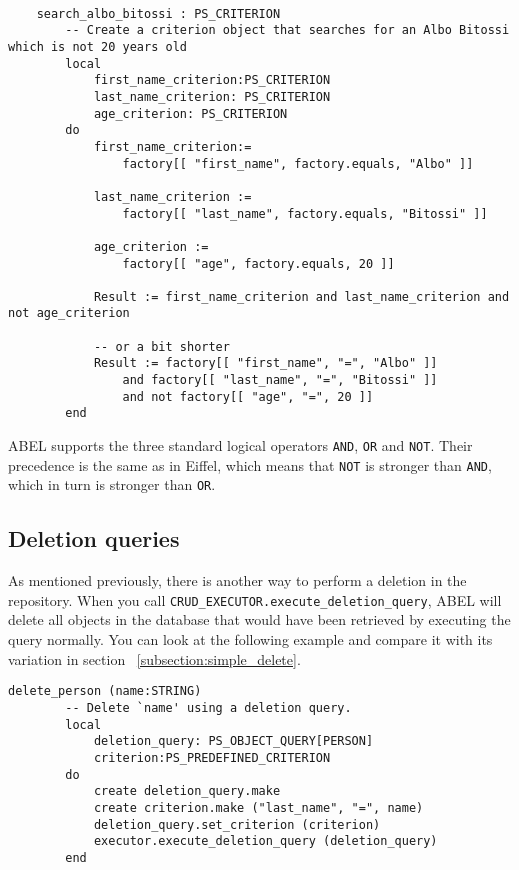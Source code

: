 \begin{lstlisting}[language=OOSC2Eiffel, captionpos=b, caption={}, label={lst:search_albo_bitossi}]

	search_albo_bitossi : PS_CRITERION
		-- Create a criterion object that searches for an Albo Bitossi which is not 20 years old
		local
			first_name_criterion:PS_CRITERION
			last_name_criterion: PS_CRITERION
			age_criterion: PS_CRITERION
		do
			first_name_criterion:= 
				factory[[ "first_name", factory.equals, "Albo" ]]

			last_name_criterion := 
				factory[[ "last_name", factory.equals, "Bitossi" ]]

			age_criterion := 
				factory[[ "age", factory.equals, 20 ]]
			
			Result := first_name_criterion and last_name_criterion and not age_criterion

			-- or a bit shorter
			Result := factory[[ "first_name", "=", "Albo" ]] 
				and factory[[ "last_name", "=", "Bitossi" ]] 
				and not factory[[ "age", "=", 20 ]]
		end
\end{lstlisting}

ABEL supports the three standard logical operators \lstinline!AND!, \lstinline!OR! and \lstinline!NOT!. 
Their precedence is the same as in Eiffel, which means that \lstinline!NOT! is stronger than \lstinline!AND!, which in turn is stronger than \lstinline!OR!.


\subsection{Deletion queries}
\label{subsection:deletion_query}


As mentioned previously, there is another way to perform a deletion in the repository.
When you call \lstinline!CRUD_EXECUTOR.execute_deletion_query!, ABEL will delete all objects in the database that would have been retrieved by executing the query normally.
You can look at the following example and compare it with its variation in section ~\ref{subsection:simple_delete}.

\begin{lstlisting}[language=OOSC2Eiffel, captionpos=b, caption={}, label={lst:deletion_query}]
	delete_person (name:STRING)
		-- Delete `name' using a deletion query.
		local
			deletion_query: PS_OBJECT_QUERY[PERSON]
			criterion:PS_PREDEFINED_CRITERION
		do
			create deletion_query.make
			create criterion.make ("last_name", "=", name)
			deletion_query.set_criterion (criterion)
			executor.execute_deletion_query (deletion_query)
		end
\end{lstlisting}

